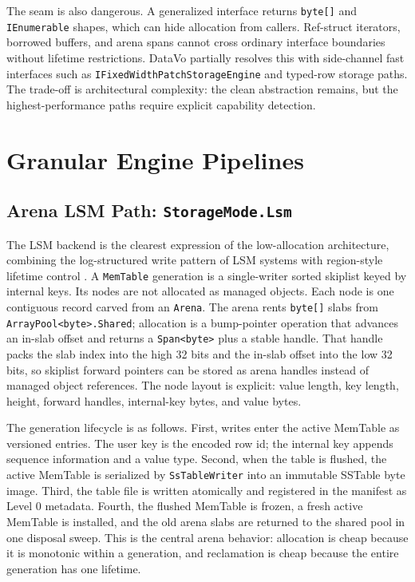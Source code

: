 \documentclass[11pt]{article}
\begin{document}
The seam is also dangerous. A generalized interface returns \texttt{byte[]} and \texttt{IEnumerable} shapes, which can hide allocation from callers. Ref-struct iterators, borrowed buffers, and arena spans cannot cross ordinary interface boundaries without lifetime restrictions. DataVo partially resolves this with side-channel fast interfaces such as \texttt{IFixedWidthPatchStorageEngine} and typed-row storage paths. The trade-off is architectural complexity: the clean abstraction remains, but the highest-performance paths require explicit capability detection.

\section{Granular Engine Pipelines}
\subsection{Arena LSM Path: \texttt{StorageMode.Lsm}}
The LSM backend is the clearest expression of the low-allocation architecture, combining the log-structured write pattern of LSM systems \cite{lsm} with region-style lifetime control \cite{region-memory}. A \texttt{MemTable} generation is a single-writer sorted skiplist keyed by internal keys. Its nodes are not allocated as managed objects. Each node is one contiguous record carved from an \texttt{Arena}. The arena rents \texttt{byte[]} slabs from \texttt{ArrayPool<byte>.Shared}; allocation is a bump-pointer operation that advances an in-slab offset and returns a \texttt{Span<byte>} plus a stable handle. That handle packs the slab index into the high 32 bits and the in-slab offset into the low 32 bits, so skiplist forward pointers can be stored as arena handles instead of managed object references. The node layout is explicit: value length, key length, height, forward handles, internal-key bytes, and value bytes.

The generation lifecycle is as follows. First, writes enter the active MemTable as versioned entries. The user key is the encoded row id; the internal key appends sequence information and a value type. Second, when the table is flushed, the active MemTable is serialized by \texttt{SsTableWriter} into an immutable SSTable byte image. Third, the table file is written atomically and registered in the manifest as Level 0 metadata. Fourth, the flushed MemTable is frozen, a fresh active MemTable is installed, and the old arena slabs are returned to the shared pool in one disposal sweep. This is the central arena behavior: allocation is cheap because it is monotonic within a generation, and reclamation is cheap because the entire generation has one lifetime.
\end{document}
